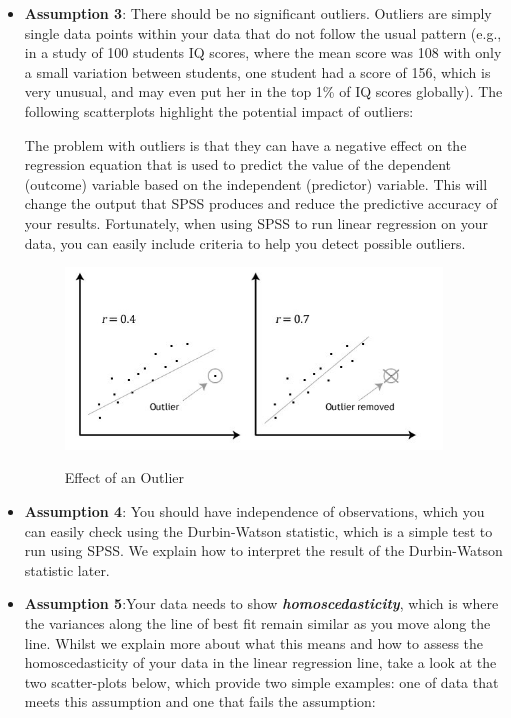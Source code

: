 \documentclass[a4paper,12pt]{article}
\begin{document}
\begin{itemize}
\item \textbf{Assumption 3}: There should be no significant outliers. Outliers are simply single data points within your data that do not follow the usual pattern (e.g., in a study of 100 students IQ scores, where the mean score was 108 with only a small variation between students, one student had a score of 156, which is very unusual, and may even put her in the top 1\% of IQ scores globally). The following scatterplots highlight the potential impact of outliers:

The problem with outliers is that they can have a negative effect on the regression equation that is used to predict the value of the dependent (outcome) variable based on the independent (predictor) variable. This will change the output that SPSS produces and reduce the predictive accuracy of your results. Fortunately, when using SPSS to run linear regression on your data, you can easily include criteria to help you detect possible outliers.
\begin{figure}[h!]
\begin{centering}
  \includegraphics[width=10cm]{images/Regre2.jpg}\\
  \caption{Effect of an Outlier}
\end{centering}
\end{figure}
\item \textbf{Assumption 4}: You should have independence of observations, which you can easily check using the Durbin-Watson statistic, which is a simple test to run using SPSS. We explain how to interpret the result of the Durbin-Watson statistic later.

\item \textbf{Assumption 5}:Your data needs to show \textbf{\textit{homoscedasticity}}, which is where the variances along the line of best fit remain similar as you move along the line. Whilst we explain more about what this means and how to assess the homoscedasticity of your data in the linear regression line, take a look at the two scatter-plots below, which provide two simple examples: one of data that meets this assumption and one that fails the assumption:


\end{itemize}
\end{document}
